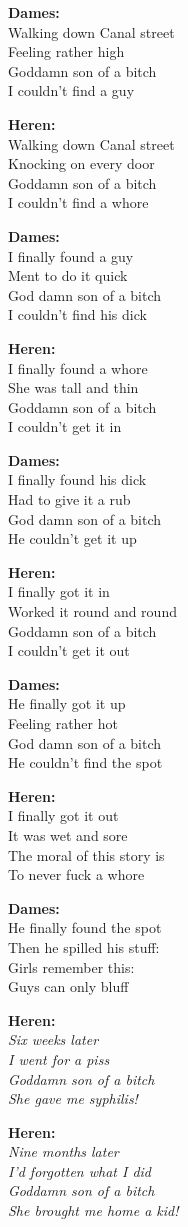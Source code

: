 \textbf{Dames:}\\
Walking down Canal street\\
Feeling rather high\\
Goddamn son of a bitch\\
I couldn’t find a guy

\textbf{Heren:}\\
Walking down Canal street\\
Knocking on every door\\
Goddamn son of a bitch\\
I couldn't find a whore

\textbf{Dames:}\\
I finally found a guy\\ 
Ment to do it quick\\
God damn son of a bitch\\
I couldn’t find his dick

\textbf{Heren:}\\
I finally found a whore\\
She was tall and thin\\
Goddamn son of a bitch\\
I couldn't get it in

\textbf{Dames:}\\
I finally found his dick\\
Had to give it a rub\\
God damn son of a bitch\\
He couldn’t get it up

\textbf{Heren:}\\
I finally got it in\\
Worked it round and round\\
Goddamn son of a bitch\\
I couldn't get it out

\textbf{Dames:}\\
He finally got it up\\
Feeling rather hot\\
God damn son of a bitch\\
He couldn’t find the spot

\textbf{Heren:}\\
I finally got it out\\
It was wet and sore\\
The moral of this story is\\
To never fuck a whore

\textbf{Dames:}\\
He finally found the spot\\
Then he spilled his stuff:\\
Girls remember this:\\
Guys can only bluff



\textbf{Heren:}\\
\textit{Six weeks later}\\
\textit{I went for a piss}\\
\textit{Goddamn son of a bitch}\\
\textit{She gave me syphilis!}

\textbf{Heren:}\\
\textit{Nine months later}\\
\textit{I'd forgotten what I did}\\
\textit{Goddamn son of a bitch}\\
\textit{She brought me home a kid!}
